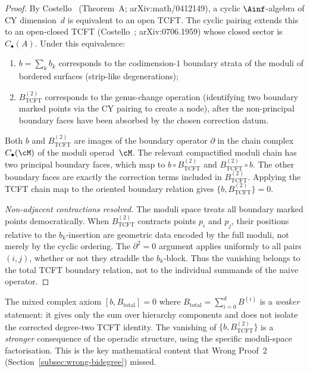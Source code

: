 \begin{proof}
By Costello~\cite{Costello2005TCFT} (Theorem~A;
arXiv:math/0412149), a cyclic $\Ainf$-algebra of CY dimension~$d$
is equivalent to an open TCFT. The cyclic pairing extends this
to an open-closed TCFT (Costello~\cite{Costello2007Ainfty};
arXiv:0706.1959) whose closed sector is $C_\bullet(A)$. Under
this equivalence:
\begin{enumerate}[label=\textup{(\roman*)}]
 \item $b = \sum_k b_k$ corresponds to the codimension-$1$
 boundary strata of the moduli of bordered surfaces
 (strip-like degenerations);
 \item $B^{(2)}_{\mathrm{TCFT}}$ corresponds to the genus-change operation
 (identifying two boundary marked points via the CY pairing
 to create a node), after the non-principal boundary faces have
 been absorbed by the chosen correction datum.
\end{enumerate}
Both $b$ and $B^{(2)}_{\mathrm{TCFT}}$ are images of the boundary operator
$\partial$ in the chain complex $C_\bullet(\cM)$ of the moduli
operad~$\cM$. The relevant compactified moduli chain has two
principal boundary faces, which map to
$b \circ B^{(2)}_{\mathrm{TCFT}}$ and
$B^{(2)}_{\mathrm{TCFT}} \circ b$.  The other boundary faces
are exactly the correction terms included in
$B^{(2)}_{\mathrm{TCFT}}$.  Applying the TCFT chain map to the
oriented boundary relation gives
$\{b, B^{(2)}_{\mathrm{TCFT}}\}=0$.

\smallskip\noindent\emph{Non-adjacent contractions resolved.}
The moduli space treats all boundary marked points democratically.
When $B^{(2)}_{\mathrm{TCFT}}$ contracts points $p_i$ and $p_j$, their positions
relative to the $b_k$-insertion are geometric data encoded by
the full moduli, not merely by the cyclic ordering. The
$\partial^2 = 0$ argument applies uniformly to all pairs
$(i,j)$, whether or not they straddle the $b_k$-block.
Thus the vanishing belongs to the total TCFT boundary relation, not to
the individual summands of the naive operator.
\end{proof}

\begin{remark}
\label{rem:tcft-vs-mixed}
The mixed complex axiom $[b, B_{\mathrm{total}}] = 0$ where
$B_{\mathrm{total}} = \sum_{i=0}^{d} B^{(i)}$ is a
\emph{weaker} statement: it gives only the sum over hierarchy
components and does not isolate the corrected degree-two TCFT
identity.  The vanishing of
$\{b, B^{(2)}_{\mathrm{TCFT}}\}$ is a \emph{stronger}
consequence of the operadic structure, using the specific
moduli-space factorisation. This is the key mathematical content
that Wrong Proof~2 (Section~\ref{subsec:wrong-bidegree}) missed.
\end{remark}

